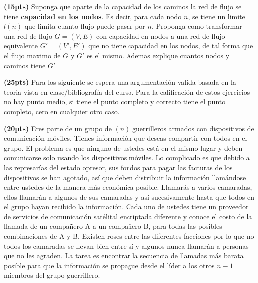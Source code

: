 \documentclass[12pt, a4paper]{exam}
\begin{document}
\begin{questions}
	\pointsdroppedatright
	\question  \textbf{(15pts)} Suponga que aparte de la capacidad de los caminos la red 
    de flujo se tiene \textbf{capacidad en los nodos}. Es decir, para cada nodo $n$, se tiene un
    limite $l(n)$ que limita cuanto flujo puede pasar por $n$. Proponga como transformar
    una red de flujo $G=(V,E)$ con capacidad en nodos a una red de flujo equivalente 
    $G'=(V',E')$ que no tiene capacidad en los nodos, de tal forma que el flujo maximo
    de $G$ y $G'$ es el mismo. Ademas explique cuantos nodos y caminos tiene $G'$ 


    \question  \textbf{(25pts)}  Para los siguiente se espera una argumentación valida basada
    en la teoria vista en clase/bibliografía del curso. Para la calificación de estos ejercicios
    no hay punto medio, si tiene el punto completo y correcto tiene el punto completo, cero en cualquier
    otro caso.
	\question \textbf{(20pts)} 
    Eres parte de un grupo de $(n)$ guerrilleros armados con dispositivos de comunicación 
    móviles. Tienes información que deseas compartir con todos en el grupo. El problema 
    es que ninguno de ustedes está en el mismo lugar y deben comunicarse solo usando 
    los dispositivos móviles. Lo complicado es que debido a las represarías del estado opresor, sus fondos para
    pagar las facturas de los dispositivos se han agotado, así que deben distribuir la 
    información llamándose entre ustedes de la manera más económica posible. Llamarás a 
    varios camaradas, ellos llamarán a algunos de sus camaradas y así sucesivamente 
    hasta que todos en el grupo hayan recibido la información. Cada uno de ustedes tiene 
    un proveedor de servicios de comunicación satélital encriptada diferente y conoce el costo de la llamada de 
    un compañero A a un compañero B, para todas las posibles combinaciones de A y B. 
    Existen roses entre las diferentes facciones por lo que no todos los camaradas se llevan bien entre sí y algunos nunca llamarán a personas 
    que no les agraden. La tarea es encontrar la secuencia de llamadas más barata posible 
    para que la información se propague desde el líder a los otros $n-1$ miembros del grupo 
    guerrillero.


\end{questions}
\end{document}
